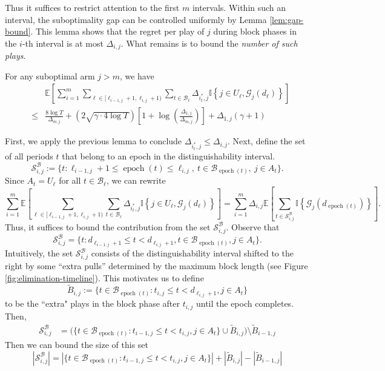 \documentclass[opre,blindrev]{informs3}
\newcommand{\epoch}{\operatorname{epoch}}
\newcommand{\ind}[1]{\mathbb{I}\left\{#1\right\}}
\newcommand{\bE}[1]{{\mathbb{E}\left[#1\right]}}
\begin{document}
\begin{APPENDICES}
Thus it suffices to restrict attention to the first \(m\) intervals. 
Within such an interval, the suboptimality gap can be controlled uniformly by Lemma \ref{lem:gap-bound}. This lemma shows that the regret per play of \(j\) during block phases in the \(i\)-th interval is at most \(\Delta_{i,j}\). 
What remains is to bound the \emph{number of such plays}. 

\begin{lemma}\label{lem:B-final}
    For any suboptimal arm \(j > m\), we have
    \begin{eqnarray*}
        &&\bE{\sum_{i=1}^m \sum_{\ell \in [\ell_{i-1,j}+1, \ell_{i,j}+1)}\sum_{t \in \mathcal{B}_\ell}\Delta_{i^*_t,j}\ind{j \in U_{\ell}, \mathcal{G}_j(d_\ell)}}
        \\
        &\leq& \frac{8\log T}{\Delta_{m,j}}+\left(2\sqrt{\gamma \cdot 4\log T}\right)\left[1+\log\left(\frac{\Delta_{1,j}}{\Delta_{m,j}}\right)\right] + \Delta_{1,j}(\gamma + 1)
    \end{eqnarray*}
\end{lemma}
    First, we apply the previous lemma to conclude \(\Delta_{i^*_t,j}\leq \Delta_{i,j}\). Next, define the set of all periods \(t\) that belong to an epoch in the distinguishability interval.
    \begin{equation}\label{eq:block-set}
        \mathcal{S}^{\mathcal B}_{i,j}
        :=
        \{t : \ell_{i-1,j}+1 \leq \epoch(t) \leq \ell_{i,j},\ t \in \mathcal{B}_{\epoch(t)},\ j \in A_t\}.
    \end{equation}
    Since \(A_t = U_\ell\) for all \(t \in \mathcal{B}_\ell\), we can rewrite
    \[
        \sum_{i=1}^m\bE{\sum_{\ell \in [\ell_{i-1,j}+1, \ell_{i,j}+1)}\sum_{t \in \mathcal{B}_\ell}\Delta_{i^*_t,j}\ind{j \in U_\ell, \mathcal{G}_j(d_\ell)}}
        = \sum_{i=1}^m\Delta_{i,j}\bE{\sum_{t \in \mathcal{S}^{\mathcal B}_{i,j}}\ind{\mathcal{G}_j(d_{\epoch(t)})}}.
    \]
    Thus, it suffices to bound the contribution from the set \(\mathcal{S}^{\mathcal B}_{i,j}\). Observe that
    \[
        \mathcal{S}^{\mathcal B}_{i,j} = \{t : d_{\ell_{i-1,j}+1} \leq t < d_{\ell_{i,j}+1}, t \in \mathcal{B}_{\epoch(t)}, j\in A_t\}.
    \] 
    Intuitively, the set \(\mathcal{S}^{\mathcal B}_{i,j}\) consists of the distinguishability interval shifted to the right by some ``extra pulls'' determined by the maximum block length (see Figure \ref{fig:elimination-timeline}). This motivates us to define 
    \[\tilde{B}_{i,j}:= \{t\in \mathcal{B}_{\epoch(t)} : t_{i,j} \leq t < d_{\ell_{i,j}+1}, j\in A_t\} \]
    to be the ``extra" plays in the block phase after \(t_{i,j}\) until the epoch completes. Then,
    \begin{align*}
        \mathcal{S}^{\mathcal B}_{i,j}
        &= \Big(\{t\in \mathcal{B}_{\epoch(t)} : t_{i-1,j} \leq t < t_{i,j}, j\in A_t\} \cup \tilde{B}_{i,j}\Big) \setminus \tilde{B}_{i-1,j}
    \end{align*}
    Then we can bound the size of this set
    \[
        |\mathcal{S}^{\mathcal B}_{i,j}| = |\{t\in \mathcal{B}_{\epoch(t)} : t_{i-1,j} \leq t < t_{i,j}, j\in A_t\}| + |\tilde{B}_{i,j}| -  |\tilde{B}_{i-1,j}|
    \]
    

\end{APPENDICES}
\end{document}
